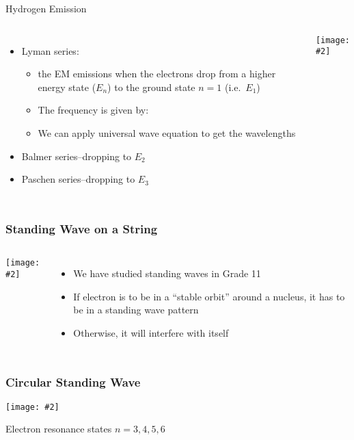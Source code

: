 \documentclass[12pt,compress,aspectratio=169]{beamer}
\newcommand{\pic}[2]{\texttt{[image: \#2]}}
\newcommand{\eq}[2]{\vspace{#1}{\Large\begin{displaymath}#2\end{displaymath}}}
\begin{document}
\begin{frame}{Hydrogen Emission}
  \begin{columns}

    \begin{itemize}
    \item Lyman series:
      \begin{itemize}
      \item the EM emissions when the electrons drop from a higher energy state
        ($E_n$) to the ground state $n=1$ (i.e.\ $E_1$)
      \item The frequency is given by:
        
        \eq{-.2in}{
          f=\frac{E_1-E_n}{h}
        }
      \item We can apply universal wave equation to get the wavelengths
      \end{itemize}
    \item Balmer series--dropping to $E_2$
    \item Paschen series--dropping to $E_3$
    \end{itemize}

    \pic{1}{400px-Hydrogen_transitions.png}
  \end{columns}
\end{frame}


\begin{frame}
  \frametitle{Standing Wave on a String}
  \begin{columns}
    \pic{1}{strhar.png}

    \begin{itemize}
    \item We have studied standing waves in Grade 11
    \item If electron is to be in a ``stable orbit'' around a nucleus, it has
      to be in a standing wave pattern
    \item Otherwise, it will interfere with itself
    \end{itemize}
  \end{columns}
\end{frame}


\begin{frame}
  \frametitle{Circular Standing Wave}
  \begin{center}
    \pic{.7}{oo1wp.png}
  \end{center}
  Electron resonance states $n=3,4,5,6$
\end{frame}
\end{document}
